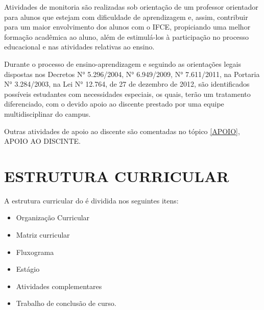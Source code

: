\documentclass{paper}
\begin{document}
Atividades de monitoria são realizadas sob orientação de um professor orientador para alunos que estejam com dificuldade de aprendizagem e, assim, contribuir para um maior envolvimento dos alunos com o IFCE, propiciando uma melhor formação acadêmica ao aluno, além de estimulá-los à participação no processo educacional e nas atividades relativas ao ensino.

Durante o processo de ensino-aprendizagem e seguindo as orientações legais dispostas nos Decretos N° 5.296/2004, N° 6.949/2009, N° 7.611/2011, na Portaria N° 3.284/2003, na Lei N° 12.764, de 27 de dezembro de 2012, são identificados possíveis estudantes com necessidades especiais, os quais, terão um tratamento diferenciado, com o devido apoio ao discente prestado por uma equipe multidisciplinar do campus.   

Outras atividades de apoio ao discente são comentadas no tópico \ref{APOIO}, APOIO AO DISCINTE.


\clearpage\section{ESTRUTURA CURRICULAR}
A estrutura curricular do \NOMECURSO é dividida nos seguintes itens: 

\begin{itemize}
\item Organização Curricular 
\item Matriz curricular 
\item Fluxograma
\item Estágio
\item Atividades complementares 
\item Trabalho de conclusão de curso. 
\end{itemize}
\end{document}
